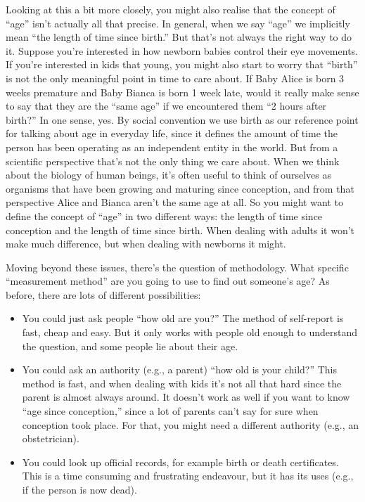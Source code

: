 \documentclass[
]{book}
\providecommand{\tightlist}{%
  \setlength{\itemsep}{0pt}\setlength{\parskip}{0pt}}
\begin{document}
Looking at this a bit more closely, you might also realise that the concept of ``age'' isn't actually all that precise. In general, when we say ``age'' we implicitly mean ``the length of time since birth.'' But that's not always the right way to do it. Suppose you're interested in how newborn babies control their eye movements. If you're interested in kids that young, you might also start to worry that ``birth'' is not the only meaningful point in time to care about. If Baby Alice is born 3 weeks premature and Baby Bianca is born 1 week late, would it really make sense to say that they are the ``same age'' if we encountered them ``2 hours after birth?'' In one sense, yes. By social convention we use birth as our reference point for talking about age in everyday life, since it defines the amount of time the person has been operating as an independent entity in the world. But from a scientific perspective that's not the only thing we care about. When we think about the biology of human beings, it's often useful to think of ourselves as organisms that have been growing and maturing since conception, and from that perspective Alice and Bianca aren't the same age at all. So you might want to define the concept of ``age'' in two different ways: the length of time since conception and the length of time since birth. When dealing with adults it won't make much difference, but when dealing with newborns it might.

Moving beyond these issues, there's the question of methodology. What specific ``measurement method'' are you going to use to find out someone's age? As before, there are lots of different possibilities:

\begin{itemize}
\tightlist
\item
  You could just ask people ``how old are you?'' The method of self-report is fast, cheap and easy. But it only works with people old enough to understand the question, and some people lie about their age.
\item
  You could ask an authority (e.g., a parent) ``how old is your child?'' This method is fast, and when dealing with kids it's not all that hard since the parent is almost always around. It doesn't work as well if you want to know ``age since conception,'' since a lot of parents can't say for sure when conception took place. For that, you might need a different authority (e.g., an obstetrician).
\item
  You could look up official records, for example birth or death certificates. This is a time consuming and frustrating endeavour, but it has its uses (e.g., if the person is now dead).
\end{itemize}
\end{document}

